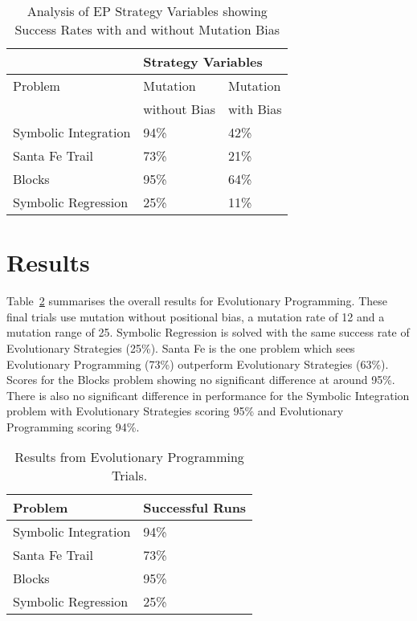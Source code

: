 \begin{table}[h]
\begin{center}
\begin{tabular}{|l|l|l|}
\hline
&\multicolumn{2}{|l|}{Strategy Variables}\\
\hline
Problem       &  Mutation      &    Mutation   \\
              &  without Bias  &    with Bias  \\
\hline
Symbolic Integration & 94\%   & 42\% \\
Santa Fe Trail       & 73\% & 21\%   \\
Blocks               & 95\% & 64\%   \\
Symbolic Regression  & 25\% & 11\%  \\
\hline
\end{tabular}
\caption{\label{ep_strategies} Analysis of EP Strategy Variables showing Success Rates with and without Mutation Bias}
\end{center}
\end{table}


\section{Results}
Table~\ref{ep_results_table} summarises the overall results for Evolutionary Programming. These final trials use mutation without positional bias, a mutation rate of 12 and a mutation range of 25. Symbolic Regression is solved with the same success rate of Evolutionary Strategies (25\%). Santa Fe is the one problem which sees Evolutionary Programming (73\%) outperform Evolutionary Strategies (63\%). Scores for the Blocks problem showing no significant difference at around 95\%. There is also no significant difference in performance for the Symbolic Integration problem with Evolutionary Strategies scoring 95\% and Evolutionary Programming scoring 94\%.

\begin{table}[h]
\begin{center}
\begin{tabular}{|l|l|}
\hline
Problem & Successful Runs \\
\hline
Symbolic Integration & 94\% \\
Santa Fe Trail & 73\% \\
Blocks & 95\% \\
Symbolic Regression & 25\% \\
\hline
\end{tabular}
\caption{ \label{ep_results_table} Results from Evolutionary Programming Trials.}
\end{center}
\end{table}






